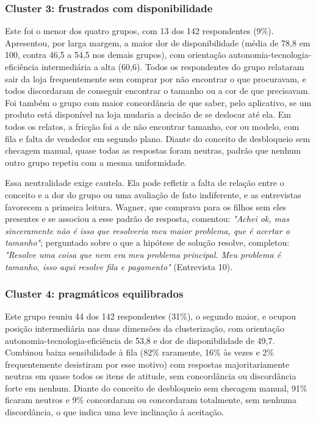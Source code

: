 \subsubsection{Cluster 3: frustrados com disponibilidade}

Este foi o menor dos quatro grupos, com 13 dos 142 respondentes (9\%). Apresentou, por larga margem, a maior dor de disponibilidade (média de 78,8 em 100, contra 46,5 a 54,5 nos demais grupos), com orientação autonomia-tecnologia-eficiência intermediária a alta (60,6). Todos os respondentes do grupo relataram sair da loja frequentemente sem comprar por não encontrar o que procuravam, e todos discordaram de conseguir encontrar o tamanho ou a cor de que precisavam. Foi também o grupo com maior concordância de que saber, pelo aplicativo, se um produto está disponível na loja mudaria a decisão de se deslocar até ela. Em todos os relatos, a fricção foi a de não encontrar tamanho, cor ou modelo, com fila e falta de vendedor em segundo plano. Diante do conceito de desbloqueio sem checagem manual, quase todas as respostas foram neutras, padrão que nenhum outro grupo repetiu com a mesma uniformidade.

Essa neutralidade exige cautela. Ela pode refletir a falta de relação entre o conceito e a dor do grupo ou uma avaliação de fato indiferente, e as entrevistas favorecem a primeira leitura. Wagner, que comprava para os filhos sem eles presentes e se associou a esse padrão de resposta, comentou: \emph{"Achei ok, mas sinceramente não é isso que resolveria meu maior problema, que é acertar o tamanho"}; perguntado sobre o que a hipótese de solução resolve, completou: \emph{"Resolve uma coisa que nem era meu problema principal. Meu problema é tamanho, isso aqui resolve fila e pagamento"} (Entrevista 10).

\subsubsection{Cluster 4: pragmáticos equilibrados}

Este grupo reuniu 44 dos 142 respondentes (31\%), o segundo maior, e ocupou posição intermediária nas duas dimensões da clusterização, com orientação autonomia-tecnologia-eficiência de 53,8 e dor de disponibilidade de 49,7. Combinou baixa sensibilidade à fila (82\% raramente, 16\% às vezes e 2\% frequentemente desistiram por esse motivo) com respostas majoritariamente neutras em quase todos os itens de atitude, sem concordância ou discordância forte em nenhum. Diante do conceito de desbloqueio sem checagem manual, 91\% ficaram neutros e 9\% concordaram ou concordaram totalmente, sem nenhuma discordância, o que indica uma leve inclinação à aceitação.


